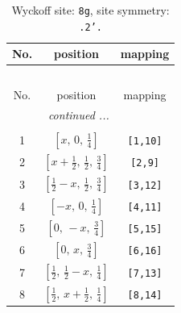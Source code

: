 \documentclass[fleqn,8pt]{jsarticle}
\begin{document}
\renewcommand{\arraystretch}{1.2}
\begin{longtable}{ccc}
\caption{Wyckoff site: {\tt 8g}, site symmetry: {\tt .2'.}}
 \\
 \hline \hline
No. & position & mapping \\ \hline \endfirsthead

\multicolumn{2}{l}{\tablename\ \thetable{}} \\
 \hline \hline
No. & position & mapping \\ \hline \endhead

 \hline \hline
\multicolumn{2}{r}{\footnotesize\it continued ...} \\ \endfoot

 \hline \hline
\multicolumn{2}{r}{} \\ \endlastfoot

1 & $\left[ x,\, 0,\, \frac{1}{4} \right]$ & {\tt [1,10]} \\ \hline
2 & $\left[ x + \frac{1}{2},\, \frac{1}{2},\, \frac{3}{4} \right]$ & {\tt [2,9]} \\ \hline
3 & $\left[ \frac{1}{2} - x,\, \frac{1}{2},\, \frac{3}{4} \right]$ & {\tt [3,12]} \\ \hline
4 & $\left[ - x,\, 0,\, \frac{1}{4} \right]$ & {\tt [4,11]} \\ \hline
5 & $\left[ 0,\, - x,\, \frac{3}{4} \right]$ & {\tt [5,15]} \\ \hline
6 & $\left[ 0,\, x,\, \frac{3}{4} \right]$ & {\tt [6,16]} \\ \hline
7 & $\left[ \frac{1}{2},\, \frac{1}{2} - x,\, \frac{1}{4} \right]$ & {\tt [7,13]} \\ \hline
8 & $\left[ \frac{1}{2},\, x + \frac{1}{2},\, \frac{1}{4} \right]$ & {\tt [8,14]} \\
\end{longtable}
\renewcommand{\arraystretch}{1.2}
\end{document}
